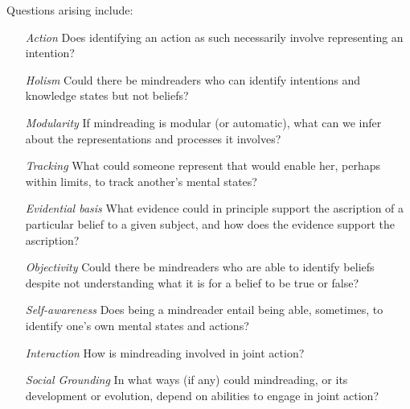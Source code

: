 \documentclass[12pt,\papersize]{extarticle}
\begin{document}
Questions arising include:
%
\begin{itemize}
%
\item [\emph{Action}] Does identifying an action as such necessarily involve representing an intention?
%
\item [\emph{Holism}] Could there be mindreaders who can identify intentions and knowledge states but not beliefs?
%
\item [\emph{Modularity}] If mindreading is modular (or  automatic), what can we infer about the representations and processes it involves?
%
\item [\emph{Tracking}] What could someone represent that would enable her, perhaps within limits, to track another's mental states?
%
\item [\emph{Evidential basis}] What evidence could in principle support the ascription of a particular belief to a given subject, and how does the evidence support the ascription?
%
\item [\emph{Objectivity}] Could there be mindreaders who are able to identify beliefs despite not understanding what it is for a belief to be true or false? 
%
\item [\emph{Self-awareness}] Does being a mindreader entail being able, sometimes, to identify one's own mental states and actions? 
%
\item [\emph{Interaction}] How is mindreading involved in joint action?  
%
\item [\emph{Social Grounding}]  In what ways (if any) could mindreading, or its development or evolution, depend on abilities to engage in joint action?  
%
\end{itemize}

%
%
\end{document}
